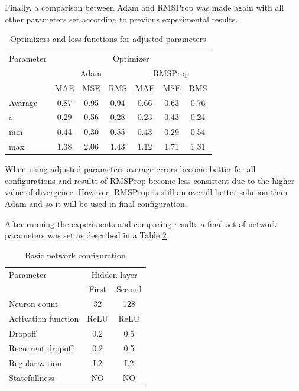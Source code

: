 Finally, a comparison between Adam and RMSProp was made again with all other parameters 
set according to previous experimental results.
\begin{table}[ht] 
	\centering
	\caption{Optimizers and loss functions for adjusted parameters}
	\label{tab:optimizers2}
	\begin{tabular}{l*{6}{c}}
		\hline
		\hline
		Parameter& \multicolumn{6}{c}{Optimizer}  \\
		&\multicolumn{3}{c}{Adam}&\multicolumn{3}{c}{RMSProp}\\
		\hline
		& MAE & MSE & RMS & MAE & MSE & RMS  \\
		Avarage & 0.87 & 0.95 & 0.94 & 0.66 & 0.63 & 0.76  \\
		$\sigma$ & 0.29 & 0.56 & 0.28 & 0.23 & 0.43 & 0.24  \\
		min & 0.44 & 0.30 & 0.55 & 0.43 & 0.29 & 0.54  \\
		max & 1.38 & 2.06 & 1.43 & 1.12 & 1.71 & 1.31  \\
		\hline
		\hline
	\end{tabular}
\end{table}
When using adjusted parameters average errors become better for all configurations and
results of RMSProp become less consistent due to the higher value of divergence.
However, RMSProp is still an overall better solution than Adam and so it will be used in final
configuration.

After running the experiments and comparing results a final set of network parameters was set
as described in a Table \ref{tab:final_config}.
\begin{table}[ht] 
	\centering
	\caption{Basic network configuration}
	\label{tab:final_config}
	\begin{tabular}{lcc}
		\hline
		\hline
		Parameter& \multicolumn{2}{c}{Hidden layer}  \\
		&First&Second\\
		\hline
		Neuron count & 32 & 128  \\
		Activation function & ReLU & ReLU  \\
		Dropoff & 0.2 & 0.5   \\
		Recurrent dropoff & 0.2 & 0.5   \\
		Regularization & L2 & L2   \\
		Statefullness & NO & NO   \\
		\hline
		\hline
	\end{tabular}
\end{table}


